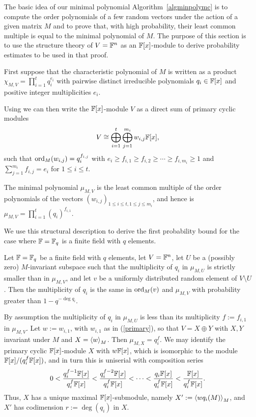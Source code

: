 The basic idea of our minimal polynomial Algorithm~\ref{algminpolymc}
is to compute the order polynomials of a few
random vectors under the action of a given matrix $M$ and to prove that, 
with high probability, their least common multiple is
equal to the minimal polynomial of $M$.
The purpose of this section is to use the structure theory 
of $V = \mathbb{F}^n$ as an $\mathbb{F}[x]$-module to derive probability
estimates to be used in that proof.

First suppose that the characteristic polynomial of $M$ is written as a product
$\chi_{M,V} = \prod_{i=1}^t q_i^{e_i}$ with pairwise distinct
irreducible polynomials $q_i \in \mathbb{F}[x]$ and positive integer
multiplicities $e_i$.

Using \cite[Theorem 3.12]{Jacob1} we can then write the $\mathbb{F}[x]$-module $V$
as a direct sum of primary cyclic modules
\begin{equation} \label{primary}
V \cong \bigoplus_{i=1}^t \bigoplus_{j=1}^{m_i} w_{i,j} \F[x], 
\end{equation}
such that $\mathrm{ord}_M(w_{i,j}) = q_i^{f_{i,j}}$ with
$e_i \ge f_{i,1} \ge f_{i,2} \ge \cdots \ge f_{i,m_i} \ge 1$
and $\sum_{j=1}^{m_i} f_{i,j}=e_i$ for $1 \le i \le t$.

The minimal polynomial $\mu_{M,V}$ is the least
common multiple of the order polynomials of the vectors 
$(w_{i,j})_{1 \le i \le t, 1 \le j \le m_i}$, and hence is 
$\mu_{M,V} = \prod_{i=1}^t (q_i)^{f_{i,1}}$.

We use this structural description to derive the
first probability bound for the case where $\mathbb{F} = \mathbb{F}_q$ is a finite field
with $q$ elements.

\begin{Prop}
\label{ProbOneMult}

Let\/ $\mathbb{F} = \mathbb{F}_q$ be a finite field with $q$ elements, let $V=\mathbb{F}^n$, let
$U$ be a (possibly zero) $M$-invariant subspace such that the multiplicity of
$q_i$ in $\mu_{M,U}$ is strictly smaller than in $\mu_{M,V}$, and let 
$v$ be a uniformly distributed random element of\/ $V\setminus U$. Then 
the multiplicity of $q_i$ is the same in $\mathrm{ord}_M(v)$ and $\mu_{M,V}$ 
with probability greater than
$1-q^{-\deg q_i}$.
\end{Prop}
\proofbeg
By assumption the multiplicity of $q_i$ in $\mu_{M,U}$ 
is less than its multiplicity $f:=f_{i,1}$ in $\mu_{M,V}$. 
Let $w:=w_{i,1}$, with $w_{i,1}$ as in (\ref{primary}), so that $V=X\oplus Y$ with
$X, Y$ invariant under $M$ and $X=\left< w\right>_M$. Then $\mu_{M,X}=
q_i^{f}$. We may identify the primary cyclic $\mathbb{F}[x]$-module 
$X$ with  $w\mathbb{F}[x]$, which is
isomorphic to the module $\mathbb{F}[x]/(q_i^{f}\mathbb{F}[x])$,
and in turn this is uniserial with composition series
\[ 
0 <   \frac{q_i^{f-1}\mathbb{F}[x]}{q_i^{f}\mathbb{F}[x]}
     <   \frac{q_i^{f-2}\mathbb{F}[x]}{q_i^{f}\mathbb{F}[x]} <
\cdots <  \frac{q_i\mathbb{F}[x]}{q_i^{f}\mathbb{F}[x]} 
       < \frac{\mathbb{F}[x]}{q_i^{f}\mathbb{F}[x]}. 
\]
Thus, $X$ has a unique maximal $\mathbb{F}[x]$-submodule, namely  $X':=\left< w q_i(M)\right>_M$,
and $X'$ has codimension $r:=\deg(q_i)$ in $X$. 

